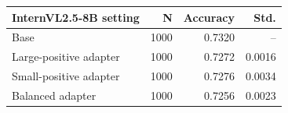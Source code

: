 \begin{tabular}{lrrr}
\toprule
InternVL2.5-8B setting & N & Accuracy & Std. \\
\midrule
Base & 1000 & 0.7320 & -- \\
Large-positive adapter & 1000 & 0.7272 & 0.0016 \\
Small-positive adapter & 1000 & 0.7276 & 0.0034 \\
Balanced adapter & 1000 & 0.7256 & 0.0023 \\
\bottomrule
\end{tabular}

